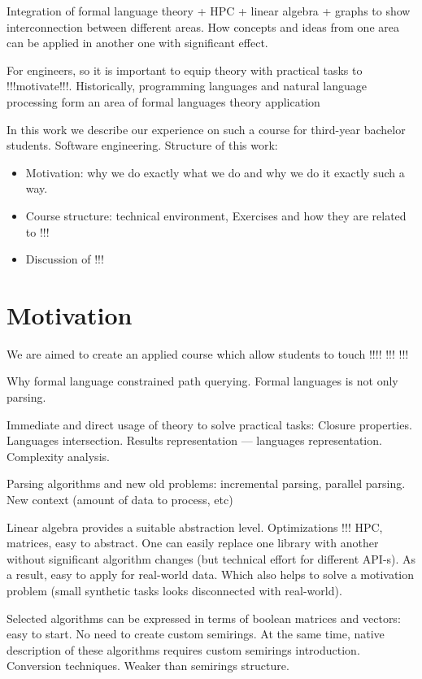 \documentclass[sigconf]{acmart}
\begin{document}
Integration of formal language theory + HPC + linear algebra + graphs to show interconnection between different areas. How concepts and ideas from one area can be applied in another one with significant effect. 

For engineers, so it is important to equip theory with practical tasks to !!!motivate!!!. Historically, programming languages and natural language processing form an area of formal languages theory application 

In this work we describe our experience on such a course for third-year bachelor students. Software engineering. Structure of this work:
\begin{itemize}
  \item Motivation: why we do exactly what we do and why we do it exactly such a way. 
  \item Course structure: technical environment, Exercises and how they are related to !!!
  \item Discussion of !!!
\end{itemize}  

\section{Motivation}

We are aimed to create an applied course which allow students to touch !!!! !!! !!! 

Why formal language constrained path querying. Formal languages is not only parsing. 

Immediate and direct usage of theory to solve practical tasks: Closure properties. Languages intersection.  Results representation --- languages representation. Complexity analysis.

Parsing algorithms and new old problems: incremental parsing, parallel parsing. New context (amount of data to process, etc)

Linear algebra provides a suitable abstraction level. Optimizations !!! HPC, matrices, easy to abstract. One can easily replace one library with another without significant algorithm changes (but technical effort for different API-s). As a result, easy to apply for real-world data. Which also helps to solve a motivation problem (small synthetic tasks looks disconnected with real-world).

Selected algorithms can be expressed in terms of boolean matrices and vectors: easy to start. No need to create custom semirings. At the same time, native description of these algorithms requires custom semirings introduction. Conversion techniques. Weaker than semirings structure. 
\end{document}

